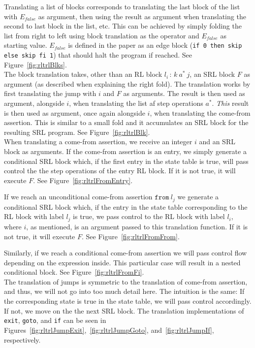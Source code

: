 \noindent Translating a list of blocks corresponds to translating the last block of the list with $E_{false}$ as argument, then using the result as argument when translating the second to last block in the list, etc. This can be achieved by simply folding the list from right to left using block translation as the operator and $E_{false}$ as starting value. $E_{false}$ is defined in the paper as an edge block (\texttt{if 0 then skip else skip fi 1}) that should halt the program if reached. See Figure~\ref{fig:rltrlBlks}.\\

\noindent The block translation takes, other than an RL block $l_i \, : \, k \ a^* \ j$, an SRL block $F$ as argument (as described when explaining the right fold). The translation works by first translating the jump with $i$ and $F$ as arguments. The result is then used as argument, alongside $i$, when translating the list af step operations $a^*$. \textit{This} result is then used as argument, once again alongside $i$, when translating the come-from assertion. This is similar to a small fold and it accumulates an SRL block for the resulting SRL program. See Figure~\ref{fig:rltrlBlk}.\\

\noindent When translating a come-from assertion, we receive an integer $i$ and an SRL block as arguments. If the come-from assertion is an entry, we simply generate a conditional SRL block which, if the first entry in the state table is true, will pass control the the step operations of the entry RL block. If it is not true, it will execute $F$. See Figure~\ref{fig:rltrlFromEntry}.

If we reach an unconditional come-from assertion $\texttt{from} \ l_j$ we generate a conditional SRL block which, if the entry in the state table corresponding to the RL block with label $l_j$ is true, we pass control to the RL block with label $l_i$, where $i$, as mentioned, is an argument passed to this translation function. If it is not true, it will execute $F$. See Figure~\ref{fig:rltrlFromFrom}.

Similarly, if we reach a conditional come-from assertion we will pass control flow depending on the expression inside. This particular case will result in a nested conditional block. See Figure~\ref{fig:rltrlFromFi}.\\

\noindent The translation of jumps is symmetric to the translation of come-from assertion, and thus, we will not go into too much detail here. The intuition is the same: If the corresponding state is true in the state table, we will pass control accordingly. If not, we move on the the next SRL block. The translation implementations of \texttt{exit}, \texttt{goto}, and \texttt{if} can be seen in Figures~\ref{fig:rltrlJumpExit},~\ref{fig:rltrlJumpGoto}, and~\ref{fig:rltrlJumpIf}, respectively.\\

